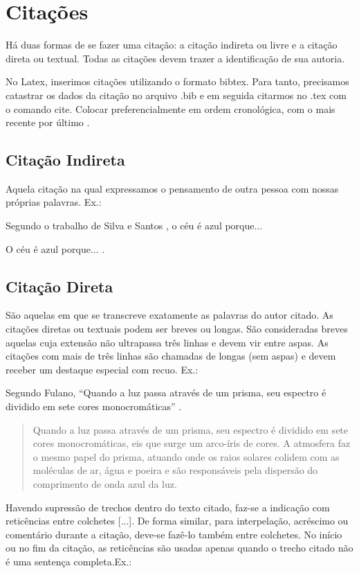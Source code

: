 \section{Citações}
Há duas formas de se fazer uma citação: a citação indireta ou livre e a citação direta ou textual. Todas as citações devem trazer a identificação de sua autoria.

No Latex, inserimos citações utilizando o formato bibtex. Para tanto, precisamos catastrar os dados da citação no arquivo .bib e em seguida citarmos no .tex com o comando cite. Colocar preferencialmente em ordem cronológica, com o mais recente por último \cite{livro, artigo, tese, capitulo, paper, site, apresentacao}.

\subsection{Citação Indireta}
Aquela citação na qual expressamos o pensamento de outra pessoa com nossas próprias palavras. Ex.:

Segundo o trabalho de Silva e Santos \citeyearpar{artigo}, o céu é azul porque...

O céu é azul porque... \cite{artigo}.

\subsection{Citação Direta}
São aquelas em que se transcreve exatamente as palavras do autor citado. As citações diretas ou textuais podem ser breves ou longas. São consideradas breves aquelas cuja extensão não ultrapassa três linhas e devem vir entre aspas. As citações com mais de três linhas são chamadas de longas (sem aspas) e devem receber um destaque especial com recuo.  Ex.:

Segundo Fulano, ``Quando a luz passa através de um prisma, seu espectro é dividido em sete cores monocromáticas'' \citeyearpar{artigo}.

\begin{quote}
Quando a luz passa através de um prisma, seu espectro é dividido em sete cores monocromáticas, eis que surge um arco-íris de cores. A atmosfera faz o mesmo papel do prisma, atuando onde os raios solares colidem com as moléculas de ar, água e poeira e são responsáveis pela dispersão do comprimento de onda azul da luz. \cite{artigo}
\end{quote}

Havendo supressão de trechos dentro do texto citado, faz-se a indicação com reticências entre colchetes [...]. De forma similar, para interpelação, acréscimo ou comentário durante a citação, deve-se fazê-lo também entre colchetes. No início ou no fim da citação, as reticências são usadas apenas quando o trecho citado não é uma sentença completa.Ex.:

